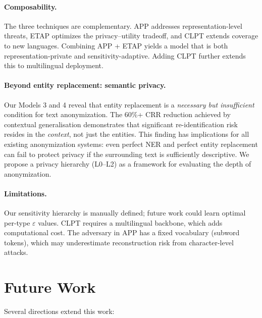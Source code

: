 \documentclass[11pt,a4paper]{article}
\begin{document}
\paragraph{Composability.}
The three techniques are complementary.  APP addresses representation-level
threats, ETAP optimizes the privacy--utility tradeoff, and CLPT extends
coverage to new languages.  Combining APP + ETAP yields a model that is both
representation-private and sensitivity-adaptive.  Adding CLPT further extends
this to multilingual deployment.

\paragraph{Beyond entity replacement: semantic privacy.}
Our Models 3 and 4 reveal that entity replacement is a \emph{necessary but
insufficient} condition for text anonymization.  The 60\%+ CRR reduction
achieved by contextual generalisation demonstrates that significant
re-identification risk resides in the \emph{context}, not just the entities.
This finding has implications for all existing anonymization systems: even
perfect NER and perfect entity replacement can fail to protect privacy if the
surrounding text is sufficiently descriptive.  We propose a privacy hierarchy
(L0--L2) as a framework for evaluating the depth of anonymization.

\paragraph{Limitations.}
Our sensitivity hierarchy is manually defined; future work could learn
optimal per-type $\varepsilon$ values.  CLPT requires a multilingual backbone,
which adds computational cost.  The adversary in APP has a fixed vocabulary
(subword tokens), which may underestimate reconstruction risk from character-level
attacks.

\section{Future Work}
\label{sec:future}

Several directions extend this work:
\end{document}

